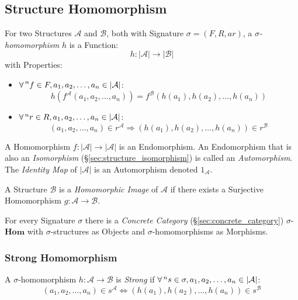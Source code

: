 \subsection{Structure Homomorphism}\label{sec:structure_homomorphism}

For two Structures $\mathcal{A}$ and $\mathcal{B}$, both with
Signature $\sigma = (F,R,ar)$, a \emph{$\sigma$-homomorphism} $h$ is a
Function:
\[
    h : |\mathcal{A}| \rightarrow |\mathcal{B}|
\]
with Properties:
\begin{itemize}
    \item $\forall \prescript{n}{}{f} \in F,
    a_1, a_2,\ldots, a_n \in |\mathcal{A}|$:
\[
    h (f^\mathcal{A}(a_1, a_2,\ldots, a_n))
    = f^\mathcal{B} (h(a_1), h(a_2),\ldots, h(a_n))
\]
    \item $\forall \prescript{n}{}{r} \in R,
    a_1, a_2,\ldots, a_n \in |\mathcal{A}|$:
\[
    (a_1,a_2,\ldots,a_n) \in r^\mathcal{A} \Rightarrow
    (h(a_1), h(a_2),\ldots,h(a_n)) \in r^\mathcal{B}
\]
\end{itemize}
A Homomorphism $f : |\mathcal{A}| \rightarrow |\mathcal{A}|$ is an
Endomorphism. An Endomorphism that is also an \emph{Isomorphism}
(\S\ref{sec:structure_isomorphism}) is called an \emph{Automorphism}.
The \emph{Identity Map} of $|\mathcal{A}|$ is an Automorphism denoted
$1_\mathcal{A}$.

A Structure $\mathcal{B}$ is a \emph{Homomorphic Image} of
$\mathcal{A}$ if there exists a Surjective Homomorphism $g :
\mathcal{A} \rightarrow \mathcal{B}$.

For every Signature $\sigma$ there is a \emph{Concrete Category}
(\S\ref{sec:concrete_category}) $\sigma$-$\mathbf{Hom}$ with
$\sigma$-structures as Objects and $\sigma$-homomorphisms as
Morphisms.



\subsubsection{Strong Homomorphism}\label{sec:strong_homomorphism}

A $\sigma$-homomorphism $h : \mathcal{A} \rightarrow \mathcal{B}$ is
\emph{Strong} if $\forall \prescript{n}{}{s} \in \sigma, a_1,
a_2,\ldots, a_n \in |\mathcal{A}|$:
\[
    (a_1, a_2,\ldots, a_n) \in s^\mathcal{A} \Leftrightarrow
    (h(a_1), h(a_2),\ldots,h(a_n)) \in s^\mathcal{B}
\]



